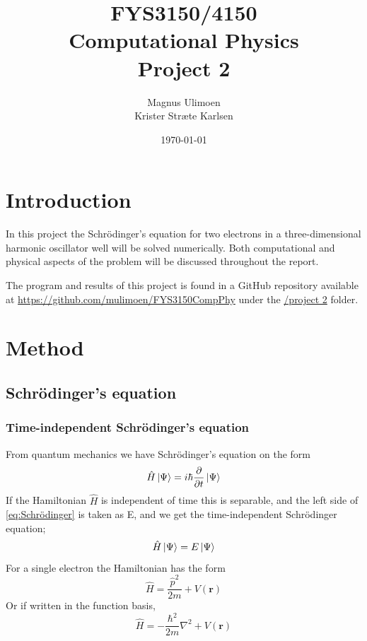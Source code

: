 \documentclass[11pt,a4paper,english,final]{article}
\title{FYS3150/4150\\Computational Physics\\Project 2}
\author{Magnus Ulimoen\\Krister Stræte Karlsen}
\date{\today}
\numberwithin{equation}{section}
\newcommand{\ve}[1]{\mathbf{#1}} %
\let\oldhat\hat
\renewcommand{\hat}[1]{\oldhat{#1}}
\begin{document}
\maketitle

\section{Introduction}

In this project the Schrödinger's equation for two electrons in a
three-dimensional harmonic oscillator well will be solved numerically. 
Both computational and physical aspects of the problem will be discussed 
throughout the report. 

The program and results of this project is found in a GitHub repository
available at 
\url{https://github.com/mulimoen/FYS3150CompPhy} under the 
\url{/project 2} folder.

\section{Method}

\subsection{Schrödinger's equation}


\subsubsection{Time-independent Schrödinger's equation}
From quantum mechanics we have Schrödinger's equation on the form
\begin{equation}
\hat{H} \ket{\Psi} = i\hbar \frac{\partial }{\partial t} \ket{\Psi}
\label{eq:Schrödinger}
\end{equation}
If the Hamiltonian $\hat{H}$ is independent of time this is separable,
and the left side of \eqref{eq:Schrödinger} is taken as E, and we get the
time-independent Schrödinger equation;
\begin{equation}
 \hat{H}\ket{\Psi} = E\ket{\Psi}
\end{equation}
For a single electron the Hamiltonian has the form 
\begin{equation}
\hat{H} = \frac{\hat{p}^2}{2m} + V(\ve{r})
\end{equation}
Or if written in the function basis,
\begin{equation}
\hat{H} = -\frac{\hbar^2}{2m}\nabla^2 + V(\ve{r})
\label{eq:Hamiltonian}
\end{equation}
\end{document}
